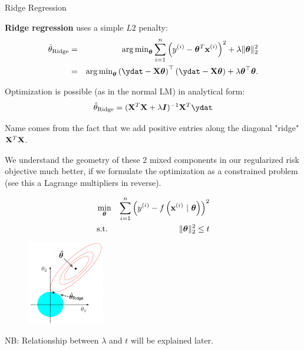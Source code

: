 \begin{vbframe}{Ridge Regression}

  \textbf{Ridge regression} uses a simple $L2$ penalty:
  \begin{eqnarray*}
  \thetah_{\text{Ridge}} &=& \argmin_{\thetab} \sumin \left(\yi - \thetab^T \xi \right)^2 + \lambda \|\thetab\|_2^2 \\
  &=& \argmin_{\thetab} \left(\ydat - \Xmat \thetab\right)^\top \left(\ydat - \Xmat \thetab\right) + \lambda \thetab^\top \thetab.
  \end{eqnarray*}

Optimization is possible (as in the normal LM) in analytical form:
$$\thetah_{\text{Ridge}} = ({\Xmat}^T \Xmat  + \lambda \id)^{-1} \Xmat^T\ydat$$

Name comes from the fact that we add positive entries along the diagonal "ridge" $\mathbf{X}^T \mathbf{X}$.

\framebreak

We understand the geometry of these 2 mixed components in our regularized risk objective much better, if we formulate the optimization as a constrained problem (see this a Lagrange multipliers in reverse).

\vspace{-0.5cm}

\begin{eqnarray*}
\min_{\bm{\theta}} && \sum\limits_{i=1}^n \left(y^{(i)} - f\left(\mathbf{x}^{(i)} ~|~ \bm{\theta}\right)\right)^2 \\
  \text{s.t. } && \|\bm{\theta}\|_2^2  \leq t \\
\end{eqnarray*}

\vspace{-1.0cm}

\begin{figure}
\includegraphics[width=0.3\textwidth]{figure_man/ridge_hat.png}
\end{figure}

\begin{footnotesize}
NB: Relationship between $\lambda$ and $t$ will be explained later.
\end{footnotesize}


\end{vbframe}
